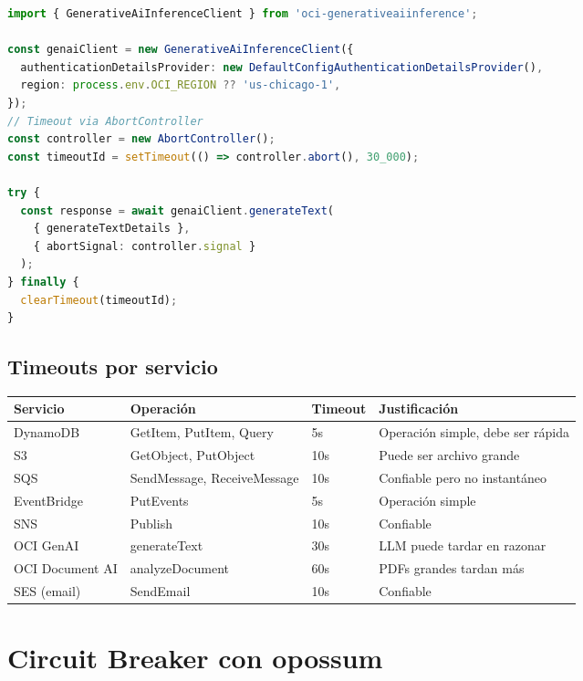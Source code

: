 \documentclass[11pt,a4paper]{article}
\begin{document}
\begin{lstlisting}[language=TypeScript, caption={Timeout en OCI SDK}]
import { GenerativeAiInferenceClient } from 'oci-generativeaiinference';

const genaiClient = new GenerativeAiInferenceClient({
  authenticationDetailsProvider: new DefaultConfigAuthenticationDetailsProvider(),
  region: process.env.OCI_REGION ?? 'us-chicago-1',
});
// Timeout via AbortController
const controller = new AbortController();
const timeoutId = setTimeout(() => controller.abort(), 30_000);

try {
  const response = await genaiClient.generateText(
    { generateTextDetails },
    { abortSignal: controller.signal }
  );
} finally {
  clearTimeout(timeoutId);
}
\end{lstlisting}

\subsection{Timeouts por servicio}

\begin{longtable}{|p{4cm}|p{3cm}|p{2.5cm}|p{4cm}|}
\hline
\rowcolor{primary!20}
\textbf{Servicio} & \textbf{Operaci\'on} & \textbf{Timeout} & \textbf{Justificaci\'on} \\
\hline
\endhead
DynamoDB & GetItem, PutItem, Query & 5s & Operaci\'on simple, debe ser r\'apida \\
\hline
S3 & GetObject, PutObject & 10s & Puede ser archivo grande \\
\hline
SQS & SendMessage, ReceiveMessage & 10s & Confiable pero no instant\'aneo \\
\hline
EventBridge & PutEvents & 5s & Operaci\'on simple \\
\hline
SNS & Publish & 10s & Confiable \\
\hline
OCI GenAI & generateText & 30s & LLM puede tardar en razonar \\
\hline
OCI Document AI & analyzeDocument & 60s & PDFs grandes tardan m\'as \\
\hline
SES (email) & SendEmail & 10s & Confiable \\
\hline
\end{longtable}

\section{Circuit Breaker con opossum}
\end{document}
